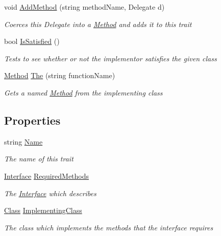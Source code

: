 \begin{DoxyCompactItemize}
void \hyperlink{classHumDrum_1_1Traits_1_1Trait_a3f7d772a82dc19c402bb08ce00c4f068}{Add\+Method} (string method\+Name, Delegate d)
\begin{DoxyCompactList}\small\item\em Coerces this Delegate into a \hyperlink{classHumDrum_1_1Traits_1_1Method}{Method} and adds it to this trait \end{DoxyCompactList}\item 
bool \hyperlink{classHumDrum_1_1Traits_1_1Trait_a6a63ae3fa959009dcc166b48a7ade10a}{Is\+Satisfied} ()
\begin{DoxyCompactList}\small\item\em Tests to see whether or not the implementor satisfies the given class \end{DoxyCompactList}\item 
\hyperlink{classHumDrum_1_1Traits_1_1Method}{Method} \hyperlink{classHumDrum_1_1Traits_1_1Trait_a64761f85f3de19b1eb406a963ff4929b}{The} (string function\+Name)
\begin{DoxyCompactList}\small\item\em Gets a named \hyperlink{classHumDrum_1_1Traits_1_1Method}{Method} from the implementing class \end{DoxyCompactList}\end{DoxyCompactItemize}
\subsection*{Properties}
\begin{DoxyCompactItemize}
\item 
string \hyperlink{classHumDrum_1_1Traits_1_1Trait_a1127f27ad57f5578c010c4785eac06b3}{Name}
\begin{DoxyCompactList}\small\item\em The name of this trait \end{DoxyCompactList}\item 
\hyperlink{classHumDrum_1_1Traits_1_1Interface}{Interface} \hyperlink{classHumDrum_1_1Traits_1_1Trait_a44f53e84d7ce34f84ce3be1e60345368}{Required\+Methods}
\begin{DoxyCompactList}\small\item\em The \hyperlink{classHumDrum_1_1Traits_1_1Interface}{Interface} which describes \end{DoxyCompactList}\item 
\hyperlink{classHumDrum_1_1Traits_1_1Class}{Class} \hyperlink{classHumDrum_1_1Traits_1_1Trait_adcd5827803b20072ff79bb25ce03f055}{Implementing\+Class}
\begin{DoxyCompactList}\small\item\em The class which implements the methods that the interface requires \end{DoxyCompactList}\end{DoxyCompactItemize}


